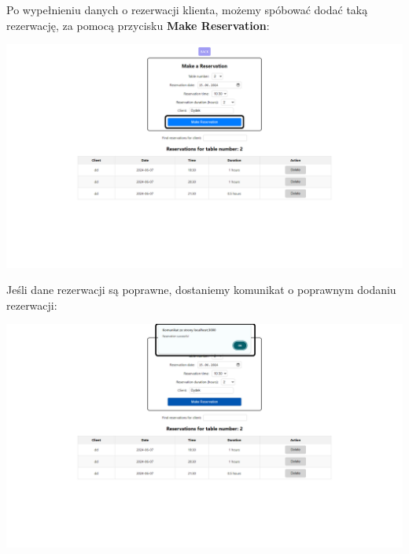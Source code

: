 \documentclass[12pt]{article}
\begin{document}
\begin{minipage}{\textwidth}
\noindent Po wypełnieniu danych o rezerwacji klienta, możemy spóbować dodać taką rezerwację, za pomocą przycisku \textbf{Make Reservation}:
\begin{center}
\includegraphics[width=\textwidth]{media/Reservations_makeReservations.png}
\end{center}
\end{minipage}

\begin{minipage}{\textwidth}
\noindent Jeśli dane rezerwacji są poprawne, dostaniemy komunikat o poprawnym dodaniu rezerwacji:
\begin{center}
\includegraphics[width=\textwidth]{media/Reservations_makeReservationsAlert.png}
\end{center}
\end{minipage}
\end{document}
